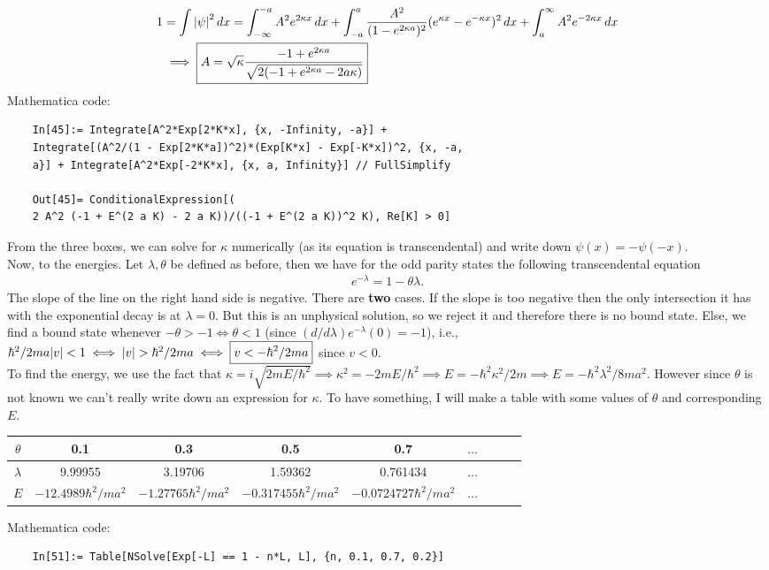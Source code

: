 \documentclass{article}
\theoremstyle{definition}
\newcommand{\f}[2]{\frac{#1}{#2}}
\begin{document}
\begin{enumerate}[label=(\alph*)]
	\begin{align*}
	1 &= \int \abs{\psi}^2\,dx =  \int_{-\infty}^{-a} A^2 e^{2\kappa x} \,dx + \int_{-a}^{a} \f{A^2}{(1-e^{2\kappa a})^2} (e^{\kappa x} - e^{-\kappa x})^2 \,dx + \int_{a}^{\infty} A^2 e^{-2\kappa x} \,dx \\
	&\implies  \boxed{{A} =  \sqrt{\kappa} \f{-1+e^{2\kappa a}}{\sqrt{2(-1 + e^{2\kappa a} - 2a\kappa)}}}
	\end{align*} 
	Mathematica code:
	\begin{lstlisting}
	In[45]:= Integrate[A^2*Exp[2*K*x], {x, -Infinity, -a}] + 
	Integrate[(A^2/(1 - Exp[2*K*a])^2)*(Exp[K*x] - Exp[-K*x])^2, {x, -a,
	a}] + Integrate[A^2*Exp[-2*K*x], {x, a, Infinity}] // FullSimplify
	
	Out[45]= ConditionalExpression[(
	2 A^2 (-1 + E^(2 a K) - 2 a K))/((-1 + E^(2 a K))^2 K), Re[K] > 0]
	\end{lstlisting}
	From the three boxes, we can solve for $\kappa$ numerically (as its equation is transcendental) and write down $\psi(x) = -\psi(-x)$. \\
	
	
	Now, to the energies. Let $\lambda, \theta$ be defined as before, then we have for the odd parity states the following transcendental equation
	\begin{align*}
	e^{-\lambda} = 1 -\theta\lambda.
	\end{align*}
	The slope of the line on the right hand side is negative. There are \textbf{two} cases. If the slope is too negative then the only intersection it has with the exponential decay is at $\lambda = 0$. But this is an unphysical solution, so we reject it and therefore there is no bound state. Else, we find a bound state whenever $-\theta > -1 \iff {\theta < 1}$ (since $(d/d\lambda)e^{-\lambda}(0) = -1$), i.e., ${\hbar^2/2ma\abs{v} < 1} \iff \abs{v} > \hbar^2/2ma \iff \boxed{v < -\hbar^2/2ma}$ since $v<0$.\\
	
	To find the energy, we use the fact that $\kappa = i\sqrt{2mE/\hbar^2} \implies \kappa^2 = -2mE/\hbar^2 \implies {E = -\hbar^2\kappa^2/2m} \implies E = -\hbar^2\lambda^2/8ma^2$. However since $\theta$ is not known we can't really write down an expression for $\kappa$. To have something, I will make a table with some values of $\theta$ and corresponding $E$. 
	
	\begin{center}
		\begin{tabular}{|c|c|c|c|c|c|c|c|c|}
			\hline
			$\theta$ & 0.1 & 0.3 & 0.5 & 0.7 &$\dots$ \\
			\hline
			$\lambda$ &9.99955&3.19706&1.59362&0.761434&$\dots$    \\
			\hline
			$E$      &$-12.4989 \hbar^2/ma^2$ &$-1.27765 \hbar^2/ma^2$& $-0.317455 \hbar^2/ma^2$ & $-0.0724727\hbar^2/ma^2$ &$\dots$ \\ 
			\hline
		\end{tabular}
	\end{center}
	Mathematica code:
	\begin{lstlisting}
	In[51]:= Table[NSolve[Exp[-L] == 1 - n*L, L], {n, 0.1, 0.7, 0.2}]
	

\end{lstlisting}
\end{enumerate}
\end{document}
